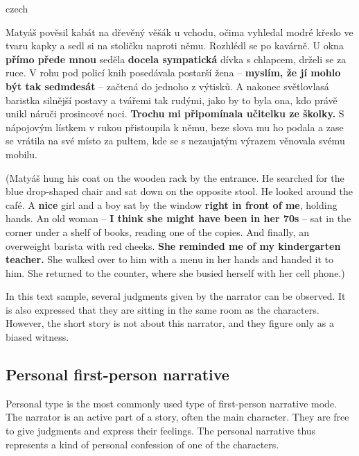 \begin{otherlanguage*}{czech}
\begin{quoting}
Matyáš pověsil kabát na dřevěný věšák u vchodu, očima vyhledal modré křeslo ve tvaru kapky a sedl si na stoličku naproti němu. Rozhlédl se po kavárně. U okna \textbf{přímo přede mnou} seděla \textbf{docela sympatická} dívka s chlapcem, drželi se za ruce. V rohu pod policí knih posedávala postarší žena -- \textbf{myslím, že jí mohlo být tak sedmdesát} -- začtená do jednoho z výtisků. A nakonec světlovlasá baristka silnější postavy a tvářemi tak rudými, jako by to byla ona, kdo právě unikl náruči prosincové noci. \textbf{Trochu mi připomínala učitelku ze školky.} S nápojovým lístkem v rukou přistoupila k němu, beze slova mu ho podala a zase se vrátila na své místo za pultem, kde se s nezaujatým výrazem věnovala svému mobilu.
\newline
\end{quoting}
\end{otherlanguage*}
\begin{quoting}
(Matyáš hung his coat on the wooden rack by the entrance. He searched for the blue drop-shaped chair and sat down on the opposite stool. He looked around the café. A \textbf{nice} girl and a boy sat by the window \textbf{right in front of me}, holding hands. An old woman -- \textbf{I think she might have been in her 70s} -- sat in the corner under a shelf of books, reading one of the copies. And finally, an overweight barista with red cheeks. \textbf{She reminded me of my kindergarten teacher.} She walked over to him with a menu in her hands and handed it to him. She returned to the counter, where she busied herself with her cell phone.)
\newline
\end{quoting}

In this text sample, several judgments given by the narrator can be observed. It is also expressed that they are sitting in the same room as the characters. However, the short story is not about this narrator, and they figure only as a biased witness.

\subsection{Personal first-person narrative}
Personal type is the most commonly used type of first-person narrative mode. The narrator is an active part of a story, often the main character. They are free to give judgments and express their feelings. The personal narrative thus represents a kind of personal confession of one of the characters. \cite{dolezel-narativni-zpusoby}\newline

